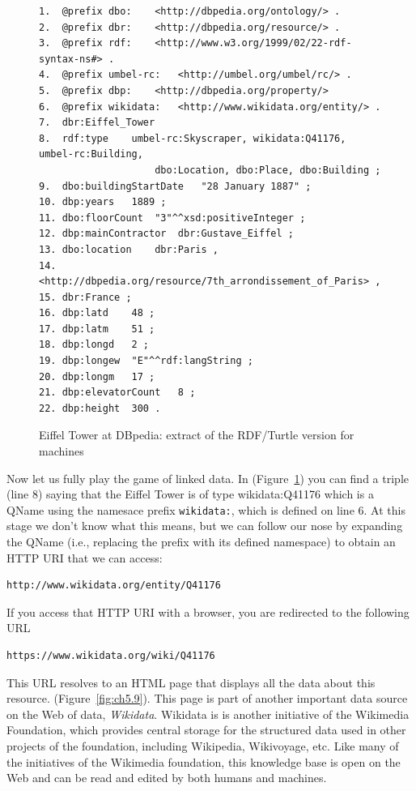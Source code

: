 \begin{figure}
 \begin{lstlisting}
1.	@prefix dbo:	<http://dbpedia.org/ontology/> .
2.	@prefix dbr:	<http://dbpedia.org/resource/> .
3.	@prefix rdf:	<http://www.w3.org/1999/02/22-rdf-syntax-ns#> .
4.	@prefix umbel-rc:	<http://umbel.org/umbel/rc/> .
5.	@prefix dbp:	<http://dbpedia.org/property/>
6.	@prefix wikidata:	<http://www.wikidata.org/entity/> .
7.	dbr:Eiffel_Tower
8.	rdf:type	umbel-rc:Skyscraper, wikidata:Q41176, umbel-rc:Building,
                    dbo:Location, dbo:Place, dbo:Building ;
9.	dbo:buildingStartDate	"28 January 1887" ;
10.	dbp:years	1889 ;
11.	dbo:floorCount	"3"^^xsd:positiveInteger ;
12.	dbp:mainContractor	dbr:Gustave_Eiffel ;
13.	dbo:location	dbr:Paris ,
14.	<http://dbpedia.org/resource/7th_arrondissement_of_Paris> ,
15.	dbr:France ;
16.	dbp:latd	48 ;
17.	dbp:latm	51 ;
18.	dbp:longd	2 ;
19.	dbp:longew	"E"^^rdf:langString ;
20.	dbp:longm	17 ;
21.	dbp:elevatorCount	8 ;
22.	dbp:height	300 .
 \end{lstlisting}
    \caption{Eiffel Tower at DBpedia: extract of the RDF/Turtle version for
machines}
    \label{fig:ch5.8}
\end{figure}

Now let us fully play the game of linked data. In (Figure~\ref{fig:ch5.8}) you can
find a triple (line 8) saying that the Eiffel Tower is of type
wikidata:Q41176 which is a QName using the namesace prefix \texttt{wikidata:}, which is defined 
on line 6. At this stage we don't know what this
means, but we can follow our nose by expanding the QName (i.e., 
replacing the prefix with its defined  namespace) to obtain an HTTP URI that we
can access:

\begin{lstlisting}
http://www.wikidata.org/entity/Q41176
\end{lstlisting}

If you access that HTTP URI with a browser, you are redirected to the
following URL

\begin{lstlisting}
https://www.wikidata.org/wiki/Q41176
\end{lstlisting}


This URL resolves to an HTML page that displays all the data about this
resource.   
(Figure~\ref{fig:ch5.9}). This page is part of another important  data source on the Web of data, 
\emph{Wikidata}. Wikidata is  is another initiative of the Wikimedia Foundation, which provides 
central storage for the structured data used in other projects of the
foundation,  including Wikipedia, Wikivoyage, etc.  Like many of the initiatives of the Wikimedia foundation, this knowledge
base is open on the Web and can be read and edited by both humans and
machines.

